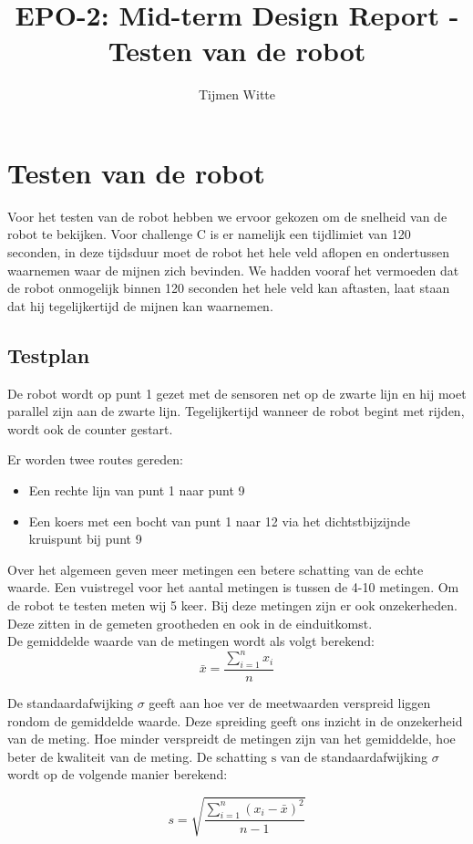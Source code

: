 \documentclass{report}
\title{EPO-2: Mid-term Design Report - Testen van de robot}
\author{Tijmen Witte}
\begin{document}
\chapter{Testen van de robot}
\label{ch:testen_robot}
Voor het testen van de robot hebben we ervoor gekozen om de snelheid van de robot te bekijken.
Voor challenge C is er namelijk een tijdlimiet van 120 seconden, in deze tijdsduur moet de robot het hele veld aflopen en ondertussen waarnemen waar de mijnen zich bevinden.
We hadden vooraf het vermoeden dat de robot onmogelijk binnen 120 seconden het hele veld kan aftasten, laat staan dat hij tegelijkertijd de mijnen kan waarnemen. 

\section{Testplan}
\label{sec:testplan}
De robot wordt op punt 1 gezet met de sensoren net op de zwarte lijn en hij moet parallel zijn aan de zwarte lijn. Tegelijkertijd wanneer de robot begint met rijden, wordt ook de counter gestart. 

Er worden twee routes gereden:
\begin{itemize}
\item Een rechte lijn van punt 1 naar punt 9
\item Een koers met een bocht van punt 1 naar 12 via het dichtstbijzijnde kruispunt bij punt 9
\end{itemize}
Over het algemeen geven meer metingen een betere schatting van de echte waarde. Een vuistregel voor het aantal metingen is tussen de 4-10 metingen. Om de robot te testen meten wij 5 keer. 
Bij deze metingen zijn er ook onzekerheden. Deze zitten in de gemeten grootheden en ook in de einduitkomst.\\ 

De gemiddelde waarde van de metingen wordt als volgt berekend:
\begin{equation}
\label{gemidd}
\bar{x}=\frac{\sum_{i=1}^{n}x_i}{n}
\end{equation}

De standaardafwijking $\sigma$ geeft aan hoe ver de meetwaarden verspreid liggen rondom de gemiddelde waarde. Deze spreiding geeft ons inzicht in de onzekerheid van de meting. Hoe minder verspreidt de metingen zijn van het gemiddelde, hoe beter de kwaliteit van de meting. De schatting $\mathrm{s}$ van de standaardafwijking $\sigma$ wordt op de volgende manier berekend:

\begin{equation} 
\label{eq:stddev}
s=\sqrt{\frac{\sum_{i=1}^{n}{(x_i-\bar{x})^2}}{n-1}}
\end{equation}
\end{document}
